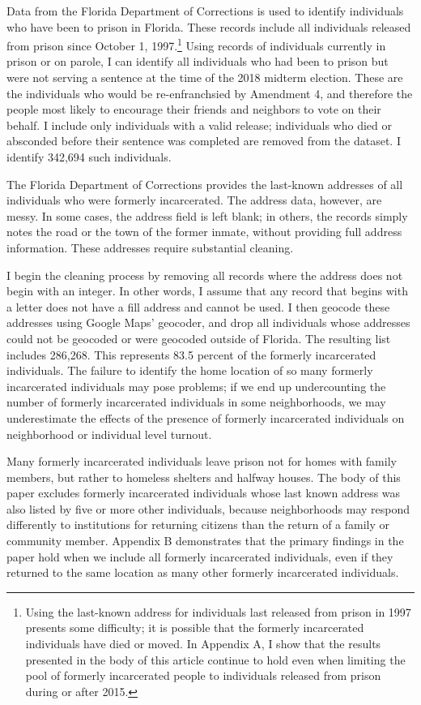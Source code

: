 \documentclass[
  12pt,
]{article}
\begin{document}
Data from the Florida Department of Corrections is used to identify individuals who have been to prison in Florida. These records include all individuals released from prison since October 1, 1997.\footnote{Using the last-known address for individuals last released from prison in 1997 presents some difficulty; it is possible that the formerly incarcerated individuals have died or moved. In Appendix A, I show that the results presented in the body of this article continue to hold even when limiting the pool of formerly incarcerated people to individuals released from prison during or after 2015.} Using records of individuals currently in prison or on parole, I can identify all individuals who had been to prison but were not serving a sentence at the time of the 2018 midterm election. These are the individuals who would be re-enfranchsied by Amendment 4, and therefore the people most likely to encourage their friends and neighbors to vote on their behalf. I include only individuals with a valid release; individuals who died or absconded before their sentence was completed are removed from the dataset. I identify 342,694 such individuals.

The Florida Department of Corrections provides the last-known addresses of all individuals who were formerly incarcerated. The address data, however, are messy. In some cases, the address field is left blank; in others, the records simply notes the road or the town of the former inmate, without providing full address information. These addresses require substantial cleaning.

I begin the cleaning process by removing all records where the address does not begin with an integer. In other words, I assume that any record that begins with a letter does not have a fill address and cannot be used. I then geocode these addresses using Google Maps' geocoder, and drop all individuals whose addresses could not be geocoded or were geocoded outside of Florida. The resulting list includes 286,268. This represents 83.5 percent of the formerly incarcerated individuals. The failure to identify the home location of so many formerly incarcerated individuals may pose problems; if we end up undercounting the number of formerly incarcerated individuals in some neighborhoods, we may underestimate the effects of the presence of formerly incarcerated individuals on neighborhood or individual level turnout.

Many formerly incarcerated individuals leave prison not for homes with family members, but rather to homeless shelters and halfway houses. The body of this paper excludes formerly incarcerated individuals whose last known address was also listed by five or more other individuals, because neighborhoods may respond differently to institutions for returning citizens than the return of a family or community member. Appendix B demonstrates that the primary findings in the paper hold when we include all formerly incarcerated individuals, even if they returned to the same location as many other formerly incarcerated individuals.
\end{document}
